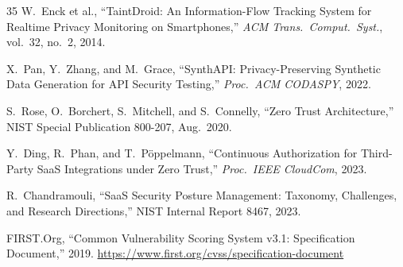 \documentclass[12pt,a4paper]{report}
\begin{document}
\begin{thebibliography}{35}
W.\ Enck et al., ``TaintDroid: An Information-Flow Tracking System for Realtime Privacy
Monitoring on Smartphones,'' \textit{ACM Trans.\ Comput.\ Syst.}, vol.\ 32, no.\ 2, 2014.

X.\ Pan, Y.\ Zhang, and M.\ Grace, ``SynthAPI: Privacy-Preserving Synthetic Data Generation
for API Security Testing,'' \textit{Proc.\ ACM CODASPY}, 2022.

S.\ Rose, O.\ Borchert, S.\ Mitchell, and S.\ Connelly, ``Zero Trust Architecture,''
NIST Special Publication 800-207, Aug.\ 2020.

Y.\ Ding, R.\ Phan, and T.\ P\"{o}ppelmann, ``Continuous Authorization for Third-Party SaaS
Integrations under Zero Trust,'' \textit{Proc.\ IEEE CloudCom}, 2023.

R.\ Chandramouli, ``SaaS Security Posture Management: Taxonomy, Challenges, and Research
Directions,'' NIST Internal Report 8467, 2023.

FIRST.Org, ``Common Vulnerability Scoring System v3.1: Specification Document,'' 2019.
\url{https://www.first.org/cvss/specification-document}

\end{thebibliography}
\end{document}
